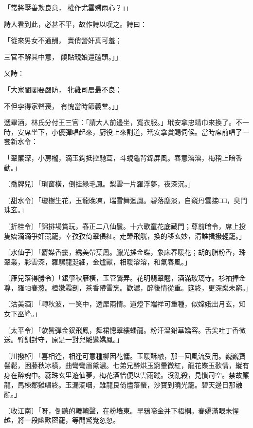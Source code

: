 \begin{showcontents}{}
「常將壓善欺良意，  權作尤雲殢雨心？」」

詩人看到此，必甚不平，故作詩以嘆之。詩曰：

「從來男女不通酬，  賣俏營奸真可羞；

三官不解其中意，  饒貼親娘還磕頭。」」

又詩：

「大家閨閣要嚴防，  牝雞司晨最不良；

不但孛得家聲喪，  有愧當時節義堂。」」

遞畢酒，林氏分付王三官：「請大人前邊坐，寬衣服。」玳安拿忠靖巾來換了。不一時，安席坐下，小優彈唱起來，廚役上來割道，玳安拿賞賜伺候。當時席前唱了一套新水令：

「翠簾深，小房櫳，滴玉鈎抵控馳茸，斗蜆龜背錦屏風。春意溶溶，梅稍上暗香動。」

〔喬牌兒〕「瑣窗橫，倒挂綠毛鳳。梨雲一片羅浮夢，夜深沉。」

〔甜水令〕「瓊樹生花，玉龍晚凍，瑞雪舞迴鳳。碧落塵淡，自窺丹雲接□□，臭門珠玄。」

〔折桂令〕「錦排場賞玩，春正二八仙鬟。十六歌童花底藏門；尊前暗令，席上投隻嬌滴滴爭奸競寵，幸孜孜倚翠偎紅。走斝飛觥，換的移玄妙，清誰揖撥輕籠。」

〔水仙子〕「麝媒香靄，綉美帶葉鳳。臘光搖金蝶，象床春暖花；胡的脂粉香，珠翠叢，彩雲深，羅騾龍涎細，金爐獸，相暖溶溶，和氣春風。」

〔雁兒落得勝令〕「銀箏秋雁橫，玉管鶯弄。花明翡翠翹，酒滿玻璃寺。衫袖捧金尊，羅帕春葱。橙嫩霜剖，茶香帶雪烹。歡濃，醉後情從重。筵終，更深樂未窮。」

〔沽美酒〕「轉秋波，一笑中，透犀兩情。道燈下端祥可重種，似嫦娥出月玄，知女下巫峰。」

〔太平令〕「欹鬢彈金釵飛鳳，舞裙憁翠縷蟠龍。粉汗溫鉛華嬌容。舌尖吐丁香微送。臂釧封守，原是一對兒雛鸞嬌鳳。」

〔川撥棹〕「喜相逢，相逢可意種柳因花慵。玉暖酥融，那一回風流受用。巍巍寶髻鬆，困藤秋冰橫，曲彎彎眉黛濃。七弟兄醉烘玉窮暈微紅，龍花蝶玉歡情，縱有身在醉魂中。蕊珠玄里遊仙夢，梅花酒恰便以雲雨蹤。沒亂殺，見慣司空。禁故簾龍，馬棟鄰雞唱終。玉漏滴咽，雖龍艮倚燼落螢，沙寶到曉光籠。碧天邊日那融融。」

〔收江南〕「呀，倒聽的轆轤聲，在粉墻東。早鴉啼金并下梧桐。春嬌滿眼未惺越，將一段幽歡密寵，等閒驚覺忽忽。


\end{showcontents}
